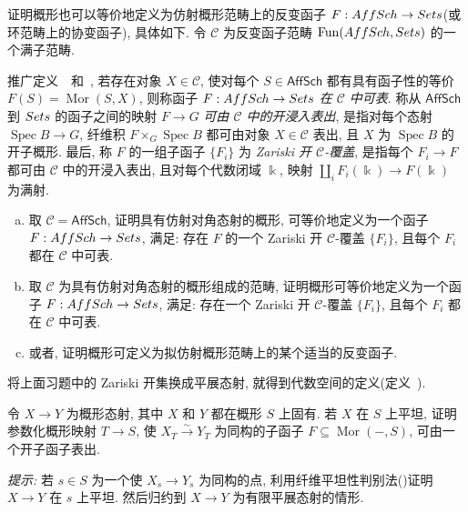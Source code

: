 \begin{exercise}[概形的函子定义]\label{src:1.3.45}
证明概形也可以等价地定义为仿射概形范畴上的反变函子 $F:AffSch\to Sets$(或环范畴上的协变函子), 具体如下. 令 $\mathcal C$ 为反变函子范畴 $\operatorname{Fun}(AffSch,Sets)$ 的一个满子范畴.

推广定义~~和~, 若存在对象 $X\in\mathcal C$, 使对每个 $S\in\mathsf{AffSch}$ 都有具有函子性的等价 $F(S)=\operatorname{Mor}(S,X)$, 则称函子 $F:AffSch\to Sets$ \textit{在 $\mathcal C$ 中可表}. 称从 $\mathsf{AffSch}$ 到 $Sets$ 的函子之间的映射 $F\to G$ \textit{可由 $\mathcal C$ 中的开浸入表出}, 是指对每个态射 $\operatorname{Spec}B\to G$, 纤维积 $F\times_G\operatorname{Spec}B$ 都可由对象 $X\in\mathcal C$ 表出, 且 $X$ 为 $\operatorname{Spec}B$ 的开子概形. 最后, 称 $F$ 的一组子函子 $\{F_i\}$ 为 \textit{Zariski 开 $\mathcal C$-覆盖}, 是指每个 $F_i\to F$ 都可由 $\mathcal C$ 中的开浸入表出, 且对每个代数闭域 $\Bbbk$, 映射 $\coprod_i F_i(\Bbbk)\to F(\Bbbk)$ 为满射.
\begin{enumerate}[(a)]
\item 取 $\mathcal C=\mathsf{AffSch}$, 证明具有仿射对角态射的概形, 可等价地定义为一个函子 $F:AffSch\to Sets$, 满足: 存在 $F$ 的一个 Zariski 开 $\mathcal C$-覆盖 $\{F_i\}$, 且每个 $F_i$ 都在 $\mathcal C$ 中可表.
\item 取 $\mathcal C$ 为具有仿射对角态射的概形组成的范畴, 证明概形可等价地定义为一个函子 $F:AffSch\to Sets$, 满足: 存在一个 Zariski 开 $\mathcal C$-覆盖 $\{F_i\}$, 且每个 $F_i$ 都在 $\mathcal C$ 中可表.
\item 或者, 证明概形可定义为拟仿射概形范畴上的某个适当的反变函子.
\end{enumerate}
\end{exercise}
将上面习题中的 Zariski 开集换成平展态射, 就得到代数空间的定义(定义~).
\begin{exercise}[困难]\label{src:1.3.46}
令 $X\to Y$ 为概形态射, 其中 $X$ 和 $Y$ 都在概形 $S$ 上固有. 若 $X$ 在 $S$ 上平坦, 证明参数化概形映射 $T\to S$, 使 $X_T\xrightarrow{\sim}Y_T$ 为同构的子函子 $F\subseteq\operatorname{Mor}(-,S)$, 可由一个开子函子表出.

\textit{提示: }若 $s\in S$ 为一个使 $X_s\to Y_s$ 为同构的点, 利用纤维平坦性判别法()证明 $X\to Y$ 在 $s$ 上平坦. 然后归约到 $X\to Y$ 为有限平展态射的情形.
\end{exercise}
